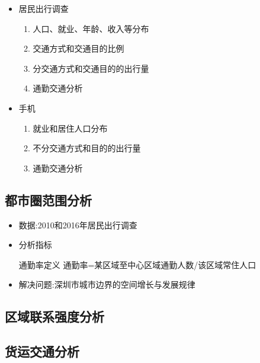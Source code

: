 \begin{frame}[t]{\subsecname}
  \begin{itemize}
     \item<1-> 居民出行调查
        \begin{enumerate}
          \item 人口、就业、年龄、收入等分布
          \item 交通方式和交通目的比例
          \item 分交通方式和交通目的的出行量
          \item 通勤交通分析 
        \end{enumerate}
  \end{itemize}
  \begin{itemize}
     \item<2-> 手机
        \begin{enumerate}
          \item 就业和居住人口分布
          \item 不分交通方式和目的的出行量
          \item 通勤交通分析 
        \end{enumerate}
  \end{itemize}

\end{frame}

\subsection{都市圈范围分析}

\begin{frame}[t]{\subsecname}
\begin{itemize}
  \item<1-> 数据:2010和2016年居民出行调查
  \item<2-> 分析指标
\begin{badbox}{通勤率定义} 
通勤率=某区域至中心区域通勤人数/该区域常住人口
\end{badbox}

  \item<3-> 解决问题:深圳市城市边界的空间增长与发展规律
\end{itemize}
\end{frame}

\begin{frame}[t]{\subsecname}

\end{frame}

\subsection{区域联系强度分析}

\subsection{货运交通分析}


